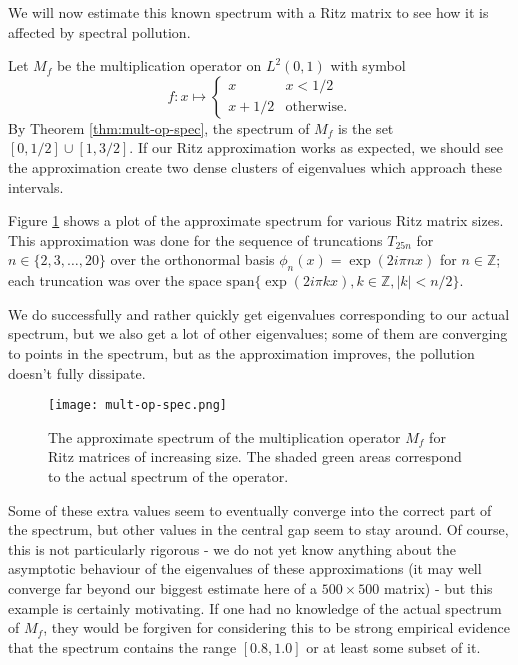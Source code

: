 \documentclass[../main.tex]{subfiles}
\begin{document}
We will now estimate this known spectrum with a Ritz matrix to see how
it is affected by spectral pollution.

\begin{example}
Let $M_f$ be the multiplication operator on $L^2(0, 1)$ with symbol
$$
f: x \mapsto \begin{cases}
x & x < 1/2 \\
x + 1/2 & \text{otherwise.}
\end{cases}
$$
By Theorem \ref{thm:mult-op-spec}, the spectrum of $M_f$ is the set $[0, 1/2]
\cup [1, 3/2]$. If our Ritz approximation works as expected, we should
see the approximation create two dense clusters of eigenvalues which
approach these intervals.
\end{example}

Figure \ref{fig:mult-op-spec} shows a plot of the approximate spectrum for
various Ritz matrix sizes. This approximation was done for the sequence of
truncations $T_{25n}$ for $n \in \{2, 3, \hdots, 20\}$ over the orthonormal
basis $\phi_n(x) = \exp(2 i \pi n x)$ for $n \in \mathbb{Z}$; each truncation
was over the space $\mathrm{span}\{\exp(2 i \pi k x), k \in \mathbb{Z}, |k| < n/2\}$.

We do successfully and rather quickly get eigenvalues corresponding to our
actual spectrum, but we also get a lot of other eigenvalues; some of them are
converging to points in the spectrum, but as the approximation improves, the
pollution doesn't fully dissipate.

\begin{figure}[h]
\centering
\texttt{[image: mult-op-spec.png]}
\caption{The approximate spectrum of the multiplication operator $M_f$ for Ritz
	matrices of increasing size. The shaded green areas correspond to the
	actual spectrum of the operator.}
\label{fig:mult-op-spec}	
\end{figure}

Some of these extra values seem to eventually converge into the correct part of
the spectrum, but other values in the central gap seem to stay around.
Of course, this is not particularly rigorous - we do not yet know anything about
the asymptotic behaviour of the eigenvalues of these approximations (it may well
converge far beyond our biggest estimate here of a $500 \times 500$ matrix) -
but this example is certainly motivating. If one had no knowledge of the actual
spectrum of $M_f$, they would be forgiven for considering this to be strong
empirical evidence that the spectrum contains the range $[0.8, 1.0]$ or at least
some subset of it. 
\end{document}
